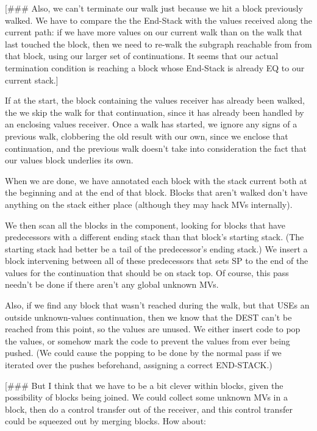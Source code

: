 [\#\#\# Also, we can't terminate our walk just because we hit a block previously
walked.  We have to compare the the End-Stack with the values received along
the current path: if we have more values on our current walk than on the walk
that last touched the block, then we need to re-walk the subgraph reachable
from from that block, using our larger set of continuations.  It seems that our
actual termination condition is reaching a block whose End-Stack is already EQ
to our current stack.]





If at the start, the block containing the values receiver has already been
walked, the we skip the walk for that continuation, since it has already been
handled by an enclosing values receiver.  Once a walk has started, we
ignore any signs of a previous walk, clobbering the old result with our own,
since we enclose that continuation, and the previous walk doesn't take into
consideration the fact that our values block underlies its own.

When we are done, we have annotated each block with the stack current both at
the beginning and at the end of that block.  Blocks that aren't walked don't
have anything on the stack either place (although they may hack MVs
internally).  

We then scan all the blocks in the component, looking for blocks that have
predecessors with a different ending stack than that block's starting stack.
(The starting stack had better be a tail of the predecessor's ending stack.)
We insert a block intervening between all of these predecessors that sets SP to
the end of the values for the continuation that should be on stack top.  Of
course, this pass needn't be done if there aren't any global unknown MVs.

Also, if we find any block that wasn't reached during the walk, but that USEs
an outside unknown-values continuation, then we know that the DEST can't be
reached from this point, so the values are unused.  We either insert code to
pop the values, or somehow mark the code to prevent the values from ever being
pushed.  (We could cause the popping to be done by the normal pass if we
iterated over the pushes beforehand, assigning a correct END-STACK.)

[\#\#\# But I think that we have to be a bit clever within blocks, given the
possibility of blocks being joined.  We could collect some unknown MVs in a
block, then do a control transfer out of the receiver, and this control
transfer could be squeezed out by merging blocks.  How about:

